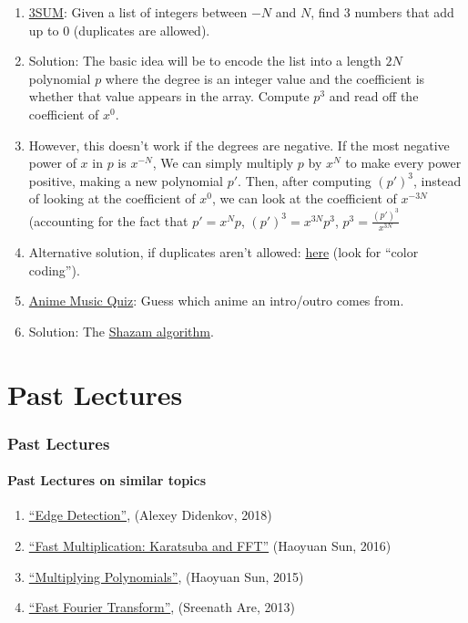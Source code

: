 \documentclass{beamer}                             %
\begin{document}
\begin{frame}
\begin{enumerate}
  \item \href{https://en.wikipedia.org/wiki/3SUM}{3SUM}:
    Given a list of integers between \( -N \) and \( N \),
    find 3 numbers that add up to 0 (duplicates are allowed). 
    \addtocounter{enumi}{-1}
  \item Solution: The basic idea will be to encode the list into a length \( 2N \)
    polynomial \( p \) where the degree is an integer value and the coefficient
    is whether that value appears in the array.
    Compute \( p^3 \) and read off the coefficient of \( x^0 \).
    \addtocounter{enumi}{-1}
  \item However, this doesn't work if the degrees are negative. If the most
    negative power of \( x \) in \( p \) is \( x^{-N} \), We can simply multiply
    \( p \) by \( x^N \) to make every power positive, making a new polynomial
    \( p' \). Then, after computing \( (p')^3 \), instead of looking at the
    coefficient of \( x^0 \), we can look at the coefficient of \( x^{-3N} \)
    (accounting for the fact that \( p' = x^N p \), \( (p')^3 = x^{3N} p^3 \),
    \( p^3 = \frac{(p')^3}{x^{3N}} \)
    \addtocounter{enumi}{-1}
  \item Alternative solution, if duplicates aren't allowed:
    \href{https://cs.stanford.edu/~rishig/courses/ref/l16.txt}{here}
    (look for \enquote{color coding}).

  \item \href{https://animemusicquiz.com/}{Anime Music Quiz}:
    Guess which anime an intro/outro comes from.
    \addtocounter{enumi}{-1}
  \item Solution: The \href{https://www.toptal.com/algorithms/shazam-it-music-processing-fingerprinting-and-recognition}
    {Shazam algorithm}.
\end{enumerate}
\end{frame}

\section{Past Lectures}

\begin{frame}
\frametitle{Past Lectures}
\framesubtitle{Past Lectures on similar topics}
\begin{enumerate}
  \item \href{https://activities.tjhsst.edu/computervision/lectures/Edge_Detection.pdf}
    {\enquote{Edge Detection}}, (Alexey Didenkov, 2018)
  \item \href{https://activities.tjhsst.edu/sct/lectures/1516/SCT_Polynomial.pdf}
    {\enquote{Fast Multiplication: Karatsuba and FFT}} (Haoyuan Sun, 2016)
  \item \href{https://activities.tjhsst.edu/sct/lectures/1415/SCT_Multiplying_Polynomials.pdf}
    {\enquote{Multiplying Polynomials}}, (Haoyuan Sun, 2015)
  \item \href{https://activities.tjhsst.edu/sct/lectures/1213/fft.pdf}
    {\enquote{Fast Fourier Transform}}, (Sreenath Are, 2013)
\end{enumerate}
\end{frame}
\end{document}
